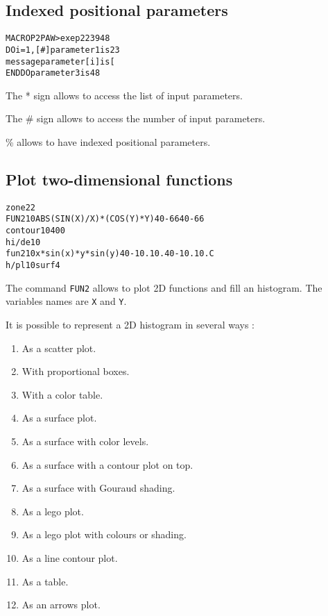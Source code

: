 \subsection*{Indexed positional parameters}
\begin{alltt}
  MACRO P2                                          PAW > exe p2 23 9 48
 DO i = 1, [#]                                           parameter 1 is 23
   message parameter [i] is [%i]                         parameter 2 is 9
  ENDDO                                                   parameter 3 is 48
\end{alltt} 
\begin{DinglistE}
\item The * sign allows to access the list of input parameters.
\item The \# sign allows to access the number of input parameters.
\item \% allows to have indexed positional parameters.
\end{DinglistE}
\clearpage
\mbox{}

\clearpage

\subsection{Plot two-dimensional functions}
\begin{alltt}
      zone 2 2
     FUN2 10 ABS(SIN(X)/X)*(COS(Y)*Y) 40 -6 6 40 -6 6
      contour 10 40 0
      hi/de 10
      fun2 10 x*sin(x)*y*sin(y) 40 -10. 10. 40 -10. 10. C
      h/pl 10 surf4
\end{alltt} 
\begin{DinglistE}
\item The command {\tt FUN2} allows to plot 2D functions and fill an
      histogram. The variables names are {\tt X} and {\tt Y}.
\item It is possible to represent a 2D histogram in several ways :
\begin{enumerate}
     \item As a scatter plot.
     \item With proportional boxes.
     \item With a color table.
     \item As a surface plot.
     \item As a surface with color levels.
     \item As a surface with a contour plot on top.
     \item As a surface with Gouraud shading.
     \item As a lego plot.
     \item As a lego plot with colours or shading.
     \item As a line contour plot.
     \item As a table.
     \item As an arrows plot.
\end{enumerate}
\end{DinglistE}

